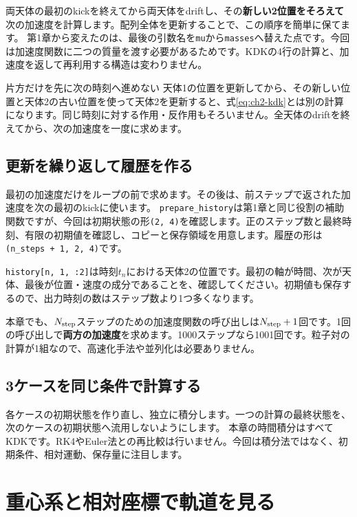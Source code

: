 両天体の最初のkickを終えてから両天体をdriftし、その\textbf{新しい2位置をそろえて}次の加速度を計算します。配列全体を更新することで、この順序を簡単に保てます。
第1章から変えたのは、最後の引数名を\texttt{mu}から\texttt{masses}へ替えた点です。今回は加速度関数に二つの質量を渡す必要があるためです。KDKの4行の計算と、加速度を返して再利用する構造は変わりません。

\begin{failbox}{片方だけを先に次の時刻へ進めない}
天体1の位置を更新してから、その新しい位置と天体2の古い位置を使って天体2を更新すると、式\eqref{eq:ch2-kdk}とは別の計算になります。同じ時刻に対する作用・反作用もそろいません。全天体のdriftを終えてから、次の加速度を一度に求めます。
\end{failbox}

\subsection{更新を繰り返して履歴を作る}
最初の加速度だけをループの前で求めます。その後は、前ステップで返された加速度を次の最初のkickに使います。
\texttt{prepare\_history}は第1章と同じ役割の補助関数ですが、今回は初期状態の形\texttt{(2, 4)}を確認します。正のステップ数と最終時刻、有限の初期値を確認し、コピーと保存領域を用意します。履歴の形は\texttt{(n\_steps + 1, 2, 4)}です。

\texttt{history[n, 1, :2]}は時刻$t_n$における天体2の位置です。最初の軸が時間、次が天体、最後が位置・速度の成分であることを、確認してください。初期値も保存するので、出力時刻の数はステップ数より1つ多くなります。

本章でも、$N_{\rm step}$ステップのための加速度関数の呼び出しは$N_{\rm step}+1$回です。1回の呼び出しで\textbf{両方の加速度}を求めます。1000ステップなら1001回です。粒子対の計算が1組なので、高速化手法や並列化は必要ありません。

\subsection{3ケースを同じ条件で計算する}
各ケースの初期状態を作り直し、独立に積分します。一つの計算の最終状態を、次のケースの初期状態へ流用しないようにします。
本章の時間積分はすべてKDKです。RK4やEuler法との再比較は行いません。今回は積分法ではなく、初期条件、相対運動、保存量に注目します。

\section{重心系と相対座標で軌道を見る}
\label{sec:ch2-figures}
